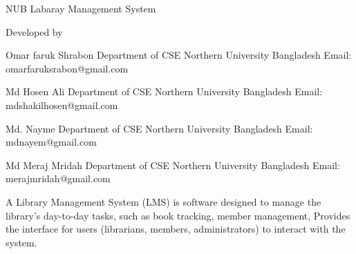  NUB Labaray Management System

                                        Developed by 

                                   Omar faruk Shrabon
                                   Department of CSE 
                     Northern University Bangladesh
                Email: omarfaruksrabon@gmail.com

                                        Md Hosen Ali 
                                   Department of CSE 
                     Northern University Bangladesh
                     Email: mdshakilhosen@gmail.com

                                          Md. Nayme
                                   Department of CSE 
                     Northern University Bangladesh
                           Email: mdnayem@gmail.com

                                    Md Meraj Mridah
                                   Department of CSE 
                     Northern University Bangladesh
                      Email: merajmridah@gmail.com

        A Library Management System (LMS) is software
        designed to manage the library's day-to-day
     tasks, such as book tracking, member management,
    Provides the interface for users (librarians,
members, administrators) to interact with the system.
